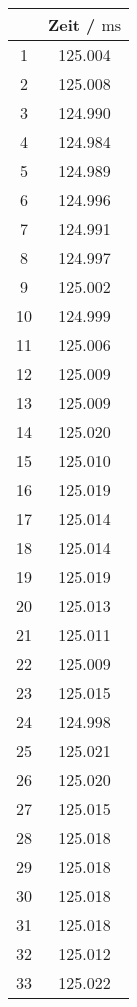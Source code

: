 \begin{multicols}{3}

    \begin{table}[H]
        \centering
        \begin{tabular}{|c|c|}
            \hline
            & Zeit / $\mathrm{ms}$ \\
            \hline
            1 & 125.004 \\
            2 & 125.008 \\
            3 & 124.990 \\
            4 & 124.984 \\
            5 & 124.989 \\
            6 & 124.996 \\
            7 & 124.991 \\
            8 & 124.997 \\
            9 & 125.002 \\
            10 & 124.999 \\
            11 & 125.006 \\
            12 & 125.009 \\
            13 & 125.009 \\
            14 & 125.020 \\
            15 & 125.010 \\
            16 & 125.019 \\
            17 & 125.014 \\
            18 & 125.014 \\
            19 & 125.019 \\
            20 & 125.013 \\
            21 & 125.011 \\
            22 & 125.009 \\
            23 & 125.015 \\
            24 & 124.998 \\
            25 & 125.021 \\
            26 & 125.020 \\
            27 & 125.015 \\
            28 & 125.018 \\
            29 & 125.018 \\
            30 & 125.018 \\
            31 & 125.018 \\
            32 & 125.012 \\
            33 & 125.022 \\

\end{tabular}
\end{table}
\end{multicols}
